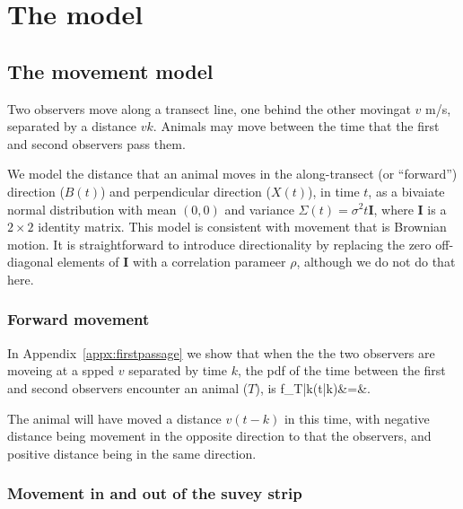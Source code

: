 \documentclass[useAMS, usenatbib, referee]{biom}
\begin{document}
\section{The model\label{sec:genmod}}


\subsection{The movement model}

Two observers move along a transect line, one behind the other movingat $v$ m/s, separated by a distance $vk$. Animals may move between the time that the first and second observers pass them. 

We model the distance that an animal moves in the along-transect (or ``forward'') direction ($B(t)$) and perpendicular direction ($X(t)$), in time $t$, as a bivaiate normal distribution with mean $(0,0)$ and variance $\Sigma(t)=\sigma^2t\bm{I}$, where $\bm{I}$ is a $2\times 2$ identity matrix. This model is consistent with movement that is Brownian motion. It is straightforward to introduce directionality by replacing the zero off-diagonal elements of $\bm{I}$ with a correlation parameer $\rho$, although we do not do that here.

\subsubsection{Forward movement}

In Appendix~\ref{appx:firstpassage} we show that when the the two observers are moveing at a spped $v$ separated by time $k$, the pdf of the time between the first and second observers encounter an animal ($T$), is 
\be
f_{T|k}(t|k)&=&.
\ee

The animal will have moved a distance $v(t-k)$ in this time, with negative distance being movement in the opposite direction to that the observers, and positive distance being in the same direction.


\subsubsection{Movement in and out of the suvey strip}
\end{document}
